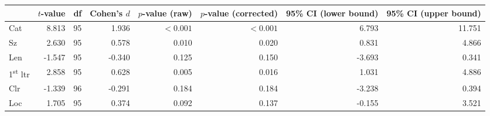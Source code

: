 \begin{tabular}{lrrrrrrr}
\toprule
 & $t$-value & df & Cohen's $d$ & $p$-value (raw) & $p$-value (corrected) & 95\% CI (lower bound) & 95\% CI (upper bound) \\
\midrule
\rowcolor[HTML]{fffee3} Cat & 8.813 & 95 & 1.936 & $< 0.001$ & $< 0.001$ & 6.793 & 11.751 \\
\rowcolor[HTML]{fffee3} Sz & 2.630 & 95 & 0.578 & 0.010 & 0.020 & 0.831 & 4.866 \\
 Len & -1.547 & 95 & -0.340 & 0.125 & 0.150 & -3.693 & 0.341 \\
\rowcolor[HTML]{fffee3} 1\textsuperscript{st} ltr & 2.858 & 95 & 0.628 & 0.005 & 0.016 & 1.031 & 4.886 \\
 Clr & -1.339 & 96 & -0.291 & 0.184 & 0.184 & -3.238 & 0.394 \\
 Loc & 1.705 & 95 & 0.374 & 0.092 & 0.137 & -0.155 & 3.521 \\
\bottomrule
\end{tabular}